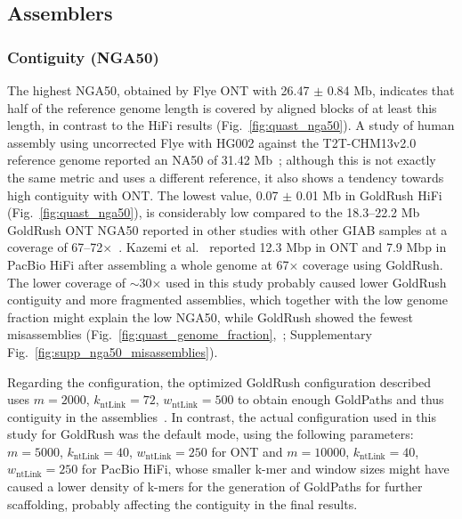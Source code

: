 \documentclass[12pt, letterpaper]{article}
\begin{document}
\subsection{Assemblers}
\subsubsection{Contiguity (NGA50)}
The highest NGA50, obtained by Flye ONT with 26.47 $\pm$ 0.84 Mb, indicates that half of the reference genome length is covered by aligned blocks of at least this length, in contrast to the HiFi results (Fig.~\ref{fig:quast_nga50}). A study of human assembly using uncorrected Flye with HG002 against the T2T-CHM13v2.0 reference genome reported an NA50 of 31.42 Mb~\cite{Munoz2025}; although this is not exactly the same metric and uses a different reference, it also shows a tendency towards high contiguity with ONT. The lowest value, 0.07 $\pm$ 0.01 Mb in GoldRush HiFi (Fig.~\ref{fig:quast_nga50}), is considerably low compared to the 18.3--22.2 Mb GoldRush ONT NGA50 reported in other studies with other GIAB samples at a coverage of 67--72$\times$~\cite{Wong2023}. Kazemi et al.~\cite{Kazemi2026} reported 12.3 Mbp in ONT and 7.9 Mbp in PacBio HiFi after assembling a whole genome at 67$\times$ coverage using GoldRush. The lower coverage of $\sim$30$\times$ used in this study probably caused lower GoldRush contiguity and more fragmented assemblies, which together with the low genome fraction might explain the low NGA50, while GoldRush showed the fewest misassemblies (Fig.~\ref{fig:quast_genome_fraction},~; Supplementary Fig.~\ref{fig:supp_nga50_misassemblies}). 

Regarding the configuration, the optimized GoldRush configuration described uses $m=2000$, $k_{\text{ntLink}}=72$, $w_{\text{ntLink}}=500$ to obtain enough GoldPaths and thus contiguity in the assemblies~\cite{Kazemi2026}. In contrast, the actual configuration used in this study for GoldRush was the default mode, using the following parameters: $m=5000$, $k_{\text{ntLink}}=40$, $w_{\text{ntLink}}=250$ for ONT and $m=10000$, $k_{\text{ntLink}}=40$, $w_{\text{ntLink}}=250$ for PacBio HiFi, whose smaller k-mer and window sizes might have caused a lower density of k-mers for the generation of GoldPaths for further scaffolding, probably affecting the contiguity in the final results.
\end{document}
